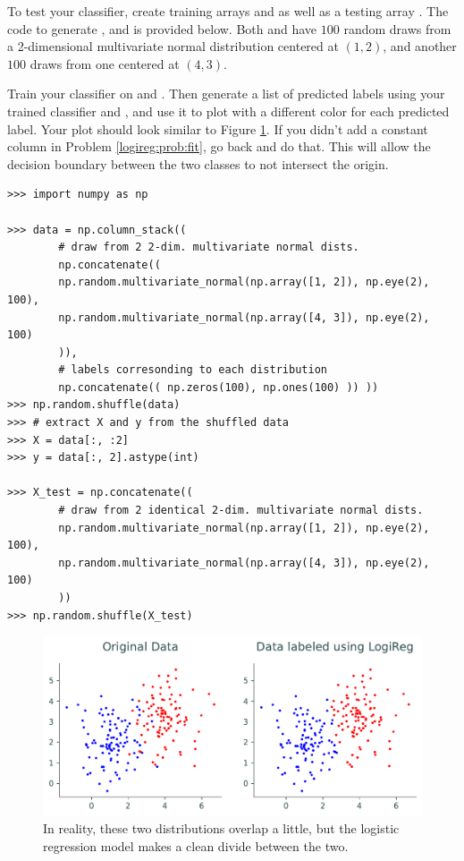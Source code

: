 \begin{problem}
To test your classifier, create training arrays  and  as well as a testing array .
The code to generate ,  and  is provided below.
Both  and  have $100$ random draws from a 2-dimensional multivariate normal distribution centered at $(1,2)$, and another $100$ draws from one centered at $(4,3)$.

Train your classifier on  and .
Then generate a list of predicted labels using your trained classifier and , and use it to plot  with a different color for each predicted label.
Your plot should look similar to Figure \ref{fig:prob3}.
If you didn't add a constant column in Problem \ref{logireg:prob:fit}, go back and do that.
This will allow the decision boundary between the two classes to not intersect the origin.

\begin{lstlisting}
>>> import numpy as np

>>> data = np.column_stack((
        # draw from 2 2-dim. multivariate normal dists.
        np.concatenate((
        np.random.multivariate_normal(np.array([1, 2]), np.eye(2), 100),
        np.random.multivariate_normal(np.array([4, 3]), np.eye(2), 100)
        )),
        # labels corresonding to each distribution
        np.concatenate(( np.zeros(100), np.ones(100) )) ))
>>> np.random.shuffle(data)
>>> # extract X and y from the shuffled data
>>> X = data[:, :2]
>>> y = data[:, 2].astype(int)

>>> X_test = np.concatenate((
        # draw from 2 identical 2-dim. multivariate normal dists.
        np.random.multivariate_normal(np.array([1, 2]), np.eye(2), 100),
        np.random.multivariate_normal(np.array([4, 3]), np.eye(2), 100)
        ))
>>> np.random.shuffle(X_test)
\end{lstlisting}
\end{problem}

\begin{figure}[H]
    \includegraphics[width=.9\textwidth]{figures/prob3_test.pdf}
    \caption{In reality, these two distributions overlap a little, but the logistic regression model makes a clean divide between the two.}
    \label{fig:prob3}
\end{figure}


